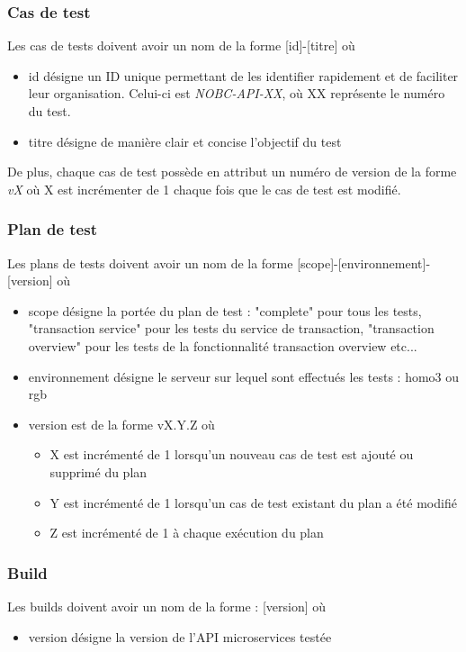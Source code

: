 	\subsubsection*{Cas de test}
	Les cas de tests doivent avoir un nom de la forme [id]-[titre] où
	\begin{itemize}
		\item id désigne un ID unique permettant de les identifier rapidement et de faciliter leur organisation. Celui-ci est \textit{NOBC-API-XX}, où XX représente le numéro du test. 
		\item titre désigne de manière clair et concise l'objectif du test
	\end{itemize}		
	De plus, chaque cas de test possède en attribut un numéro de version de la forme \textit{vX} où X est incrémenter de 1 chaque fois que le cas de test est modifié.
	
	\subsubsection*{Plan de test}
	Les plans de tests doivent avoir un nom de la forme [scope]-[environnement]-[version] où
	\begin{itemize}
		\item scope désigne la portée du plan de test : "complete" pour tous les tests, "transaction service" pour les tests du service de transaction, "transaction overview" pour les tests de la fonctionnalité transaction overview etc...
		\item environnement désigne le serveur sur lequel sont effectués les tests : homo3 ou rgb
		\item version est de la forme vX.Y.Z où
			\begin{itemize}
				\item X est incrémenté de 1 lorsqu'un nouveau cas de test est ajouté ou supprimé du plan
				\item Y est incrémenté de 1 lorsqu'un cas de test existant du plan a été modifié
				\item Z est incrémenté de 1 à chaque exécution du plan
			\end{itemize}
	\end{itemize}
	
	\subsubsection*{Build}
	Les builds doivent avoir un nom de la forme : [version] où
	\begin{itemize}
		\item version désigne la version de l'API microservices testée \\
	\end{itemize}

